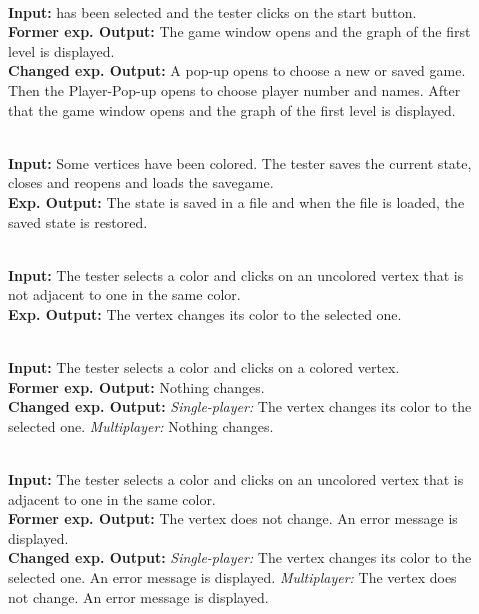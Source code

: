 \begin{description}
	\item[] \textbf{} \\
	\textbf{Input:} \graphcoloring has been selected and the tester clicks on the start button. \\
	\textbf{Former exp. Output:} The game window opens and the graph of the first level is displayed. \\
	\textbf{Changed exp. Output:} A pop-up opens to choose a new or saved game. Then the Player-Pop-up opens to choose player number and names. After that the game window opens and the graph of the first level is displayed.
	
	\item[] \textbf{} \\
	\textbf{Input:} Some vertices have been colored. The tester saves the current state, closes and reopens \graphcoloring and loads the savegame. \\
	\textbf{Exp. Output:} The state is saved in a file and when the file is loaded, the saved state is restored.
	
	\item[] \textbf{} \\
	\textbf{Input:} The tester selects a color and clicks on an uncolored vertex that is not adjacent to one in the same color. \\
	\textbf{Exp. Output:} The vertex changes its color to the selected one.
	
	\item[] \textbf{} \\
	\textbf{Input:} The tester selects a color and clicks on a colored vertex. \\
	\textbf{Former exp. Output:} Nothing changes. \\
	\textbf{Changed exp. Output:} \emph{Single-player:} The vertex changes its color to the selected one. \emph{Multiplayer:} Nothing changes.
	
	\item[] \textbf{} \\
	\textbf{Input:} The tester selects a color and clicks on an uncolored vertex that is adjacent to one in the same color. \\
	\textbf{Former exp. Output:} The vertex does not change. An error message is displayed. \\
	\textbf{Changed exp. Output:} \emph{Single-player:} The vertex changes its color to the selected one. An error message is displayed. \emph{Multiplayer:} The vertex does not change. An error message is displayed.
	

\end{description}
